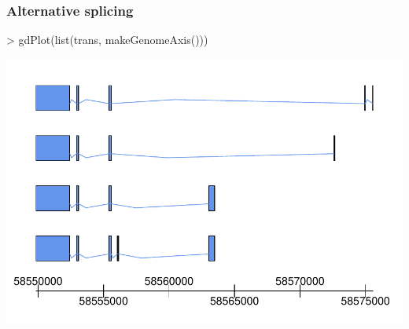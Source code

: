 \begin{frame}
  \frametitle{Alternative splicing}
\begin{Schunk}
\begin{Sinput}
> gdPlot(list(trans, makeGenomeAxis()))
\end{Sinput}
\end{Schunk}
\includegraphics{plots/fig-041}
\end{frame}



